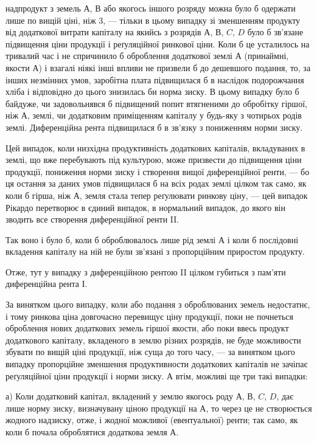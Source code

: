 \parcont{}  %
надпродукт з земель $А$, $В$ або якогось іншого розряду можна було б одержати
лише по вищій ціні, ніж 3, — тільки в цьому випадку зі зменшенням
продукту від додаткової витрати капіталу на якийсь з розрядів $А$, $В$, $C$, $D$
було б зв’язане підвищення ціни продукції і реґуляційної ринкової ціни.
Коли б це усталилось на тривалий час і не спричинило б оброблення додаткової
землі $А$ (принаймні, якости $А$) і взагалі ніякі інші впливи не призвели б
до дешевшого подання, то, за інших незмінних умов, заробітна плата підвищилася б
в наслідок подорожчання хліба і відповідно до цього знизилась би норма зиску.
В цьому випадку було б байдуже, чи задовольнявся б підвищений попит втягненими
до обробітку гіршої, ніж $А$, землі, чи додатковим приміщенням капіталу
у будь-яку з чотирьох родів землі. Диференційна рента підвищилася б в зв’язку
з пониженням норми зиску.

Цей випадок, коли низхідна продуктивність додаткових капіталів, вкладуваних
в землі, що вже перебувають під культурою, може призвести до підвищення
ціни продукції, пониження норми зиску і створення вищої диференційної
ренти, — бо ця остання за даних умов підвищилася б на всіх родах землі
цілком так само, як коли б гірша, ніж $А$, земля стала тепер реґулювати ринкову
ціну, — цей випадок Рікардо перетворює в єдиний випадок, в нормальний
випадок, до якого він зводить все створення диференційної ренти II.

Так воно і було б, коли б оброблювалось лише рід землі $А$ і коли б послідовні
вкладення капіталу на ній не були зв’язані з пропорційним приростом
продукту.

Отже, тут у випадку з диференційною рентою II цілком губиться з пам’яти
диференційна рента І.

За винятком цього випадку, коли або подання з оброблюваних земель
недостатнє, і тому ринкова ціна довгочасно перевищує ціну продукції, поки не
почнеться оброблення нових додаткових земель гіршої якости, або поки ввесь продукт
додаткового капіталу, вкладеного в землю різних розрядів, не буде можливости
збувати по вищій ціні продукції, ніж суща до того часу, — за винятком
цього випадку пропорційне зменшення продуктивности додаткових капіталів не
зачіпає реґуляційної ціни продукції і норми зиску. А втім, можливі ще три
такі випадки:

а) Коли додатковий капітал, вкладений у землю якогось роду $А$, $В$, $C$, $D$,
дає лише норму зиску, визначувану ціною продукції на $А$, то через це не
створюється жодного надзиску, отже, і жодної можливої (евентуальної) ренти;
так само, як коли б почала оброблятися додаткова земля $А$.

